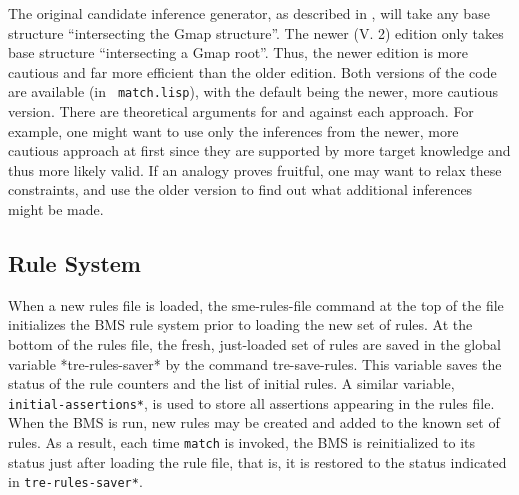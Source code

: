 The original candidate inference generator, as described in \cite{aaai86},
will take any base structure ``intersecting the Gmap structure''. The newer
(V. 2) edition only takes base structure ``intersecting a Gmap root''.
Thus, the newer edition is more cautious and far more efficient than the
older edition. Both versions of the code are available (in {\tt
match.lisp}), with the default being the newer, more cautious version. There
are theoretical arguments for and against each approach. For example, one
might want to use only the inferences from the newer, more cautious approach
at first since they are supported by more target knowledge and thus more
likely valid. If an analogy proves fruitful, one may want to relax these
constraints, and use the older version to find out what additional
inferences might be made.

\subsection{Rule System}

\indent
{}

When a new rules file is loaded, the sme-rules-file command at the top of
the file initializes the BMS rule system prior to loading the new set of
rules.  At the bottom of the rules file, the fresh, just-loaded set of rules
are saved in the global variable *tre-rules-saver* by the command
tre-save-rules.  This variable saves the status of the rule counters and the
list of initial rules. A similar variable, {\tt *initial-assertions*}, is
used to store all assertions appearing in the rules file. When the BMS is
run, new rules may be created and added to the known set of rules. As a
result, each time {\tt match} is invoked, the BMS is reinitialized to its
status just after loading the rule file, that is, it is restored to the
status indicated in {\tt *tre-rules-saver*}.

